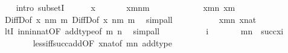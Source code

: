 \begin{isabellebody}
\ \ \isamarkupfalse%
\ {\isacharparenleft}{\kern0pt}intro\ subsetI{\isacharparenright}{\kern0pt}\isanewline
\ \ \ \ \isamarkupfalse%
\ x\ \isanewline
\ \ \ \ \isamarkupfalse%
\ {\isachardoublequoteopen}x{\isasymin}{\isacharparenleft}{\kern0pt}m{\isacharhash}{\kern0pt}{\isacharplus}{\kern0pt}n{\isacharparenright}{\kern0pt}{\isacharminus}{\kern0pt}m{\isachardoublequoteclose}\isanewline
\ \ \ \ \isamarkupfalse%
\ \isanewline
\ \ \ \ \isamarkupfalse%
\ {\isachardoublequoteopen}x{\isasymin}m{\isacharhash}{\kern0pt}{\isacharplus}{\kern0pt}n{\isachardoublequoteclose}\ {\isachardoublequoteopen}x{\isasymnotin}m{\isachardoublequoteclose}\isanewline
\ \ \ \ \ \ \isamarkupfalse%
\ DiffD{}{\isacharbrackleft}{\kern0pt}of\ x\ {\isachardoublequoteopen}n{\isacharhash}{\kern0pt}{\isacharplus}{\kern0pt}m{\isachardoublequoteclose}\ m{\isacharbrackright}{\kern0pt}\ DiffD{}{\isacharbrackleft}{\kern0pt}of\ x\ {\isachardoublequoteopen}n{\isacharhash}{\kern0pt}{\isacharplus}{\kern0pt}m{\isachardoublequoteclose}\ m{\isacharbrackright}{\kern0pt}\ \isamarkupfalse%
\ simp{\isacharunderscore}{\kern0pt}all\isanewline
\ \ \ \ \isamarkupfalse%
\isanewline
\ \ \ \ \isamarkupfalse%
\ {\isachardoublequoteopen}x{\isacharless}{\kern0pt}m{\isacharhash}{\kern0pt}{\isacharplus}{\kern0pt}n{\isachardoublequoteclose}\ {\isachardoublequoteopen}x{\isasymin}nat{\isachardoublequoteclose}\ \isanewline
\ \ \ \ \ \ \isamarkupfalse%
\ ltI\ in{\isacharunderscore}{\kern0pt}n{\isacharunderscore}{\kern0pt}in{\isacharunderscore}{\kern0pt}nat{\isacharbrackleft}{\kern0pt}OF\ add{\isacharunderscore}{\kern0pt}type{\isacharbrackleft}{\kern0pt}of\ m\ n{\isacharbrackright}{\kern0pt}{\isacharbrackright}{\kern0pt}\ \isamarkupfalse%
\ simp{\isacharunderscore}{\kern0pt}all\isanewline
\ \ \ \ \isamarkupfalse%
\isanewline
\ \ \ \ \isamarkupfalse%
\ i\ \isanewline
\ \ \ \ \ \ {\isachardoublequoteopen}m{\isacharhash}{\kern0pt}{\isacharplus}{\kern0pt}n\ {\isacharequal}{\kern0pt}\ succ{\isacharparenleft}{\kern0pt}x{\isacharhash}{\kern0pt}{\isacharplus}{\kern0pt}i{\isacharparenright}{\kern0pt}{\isachardoublequoteclose}\ \isanewline
\ \ \ \ \ \ \isamarkupfalse%
\ less{\isacharunderscore}{\kern0pt}iff{\isacharunderscore}{\kern0pt}succ{\isacharunderscore}{\kern0pt}add{\isacharbrackleft}{\kern0pt}OF\ {\isacartoucheopen}x{\isasymin}nat{\isacartoucheclose}{\isacharcomma}{\kern0pt}of\ {\isachardoublequoteopen}m{\isacharhash}{\kern0pt}{\isacharplus}{\kern0pt}n{\isachardoublequoteclose}{\isacharbrackright}{\kern0pt}\ add{\isacharunderscore}{\kern0pt}type\ \isamarkupfalse%

\end{isabellebody}
